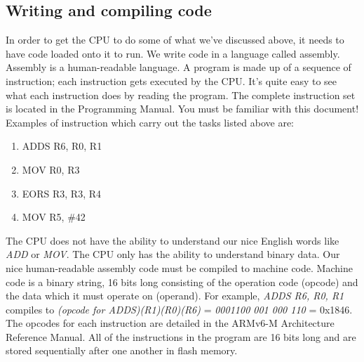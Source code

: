 \subsection{Writing and compiling code}
In order to get the CPU to do some of what we've discussed above, it needs to have code loaded onto it to run. We write code in a language called assembly. Assembly is a human-readable language. A program is made up of a sequence of instruction; each instruction gets executed by the CPU. It's quite easy to see what each instruction does by reading the program.  The complete instruction set is located in the Programming Manual. You must be familiar with this document! Examples of instruction which carry out the tasks listed above are:
\begin{enumerate}
  \item ADDS R6, R0, R1
  \item MOV R0, R3
  \item EORS R3, R3, R4
  \item MOV R5, \#42
\end{enumerate}
The CPU does not have the ability to understand our nice English words like \textit{ADD} or \textit{MOV}. The CPU only has the ability to understand binary data. Our nice human-readable assembly code must be compiled to machine code. Machine code is a binary string, 16 bits long consisting of the operation code (opcode) and the data which it must operate on (operand).
For example, \textit{ADDS R6, R0, R1} compiles to \textit{(opcode for ADDS)(R1)(R0)(R6)} = \textit{ 0001100 001 000 110 } = 0x1846.
The opcodes for each instruction are detailed in the ARMv6-M Architecture Reference Manual.
All of the instructions in the program are 16 bits long and are stored sequentially after one another in flash memory. 


